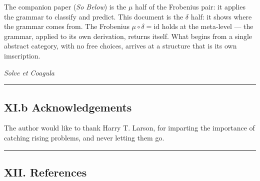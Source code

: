 \documentclass[12pt,a4paper]{article}
\makeatletter
\renewcommand{\_}{\ig@origunderscore\discretionary{}{}{}}
\makeatother
\begin{document}
The companion paper (\emph{So Below}) is the $\mu$ half of the Frobenius pair: it applies the grammar to classify and
predict. This document is the $\delta$ half: it shows where the grammar comes from. The Frobenius
$\mu \circ \delta = \text{id}$ holds at the meta-level --- the grammar, applied to its own derivation, returns itself. What begins
from a single abstract category, with no free choices, arrives at a structure that is its own imscription.

\begin{center}
\medskip
\textit{Solve et Coagula}
\medskip
\end{center}

\begin{center}
\rule{0.5\textwidth}{0.4pt}
\end{center}


\subsection{XI.b Acknowledgements}

The author would like to thank Harry T. Larson, for imparting the importance of catching rising problems, and never letting them go.

\begin{center}
\rule{0.5\textwidth}{0.4pt}
\end{center}


\subsection{XII. References}
\end{document}
